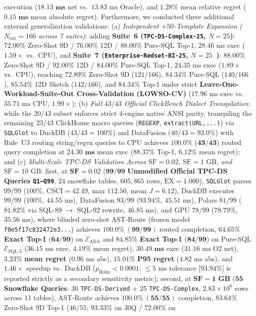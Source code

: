 \documentclass[10pt,a4paper]{article}
\begin{document}
\begin{enumerate}[leftmargin=1.5em,itemsep=0.8pt]
execution ($\mathbf{18.13\text{ ms}}$ net vs.\ $13.83\text{ ms}$ Oracle), and $\mathbf{1.28\%}$ mean relative regret ($\mathbf{0.15\text{ ms}}$ mean absolute regret). Furthermore, we conducted three additional external generalization validations: (a) \emph{Independent $+50$-Template Expansion ($N_{\text{ext}}=166$ across 7 suites)}: adding \textbf{Suite~6 (\texttt{TPC-DS-Complex-25}, $N=25$)}: $72.00\%$ Zero-Shot 9D / $76.00\%$ 12D / $88.00\%$ Pure-SQL Top-1, $28.46\text{ ms}$ exec ($1.59\times$ vs.\ CPU), and \textbf{Suite~7 (\texttt{Enterprise-Redset-BI-25}, $N=25$~\cite{vanrenen2024redset})}: $88.00\%$ Zero-Shot 9D / $92.00\%$ 12D / $84.00\%$ Pure-SQL Top-1, $24.35\text{ ms}$ exec ($1.89\times$ vs.\ CPU), reaching $\mathbf{72.89\%}$ Zero-Shot 9D ($121/166$), $\mathbf{84.34\%}$ Pure-SQL ($140/166$), $\mathbf{85.54\%}$ 12D Sketch ($142/166$), and $\mathbf{84.34\%}$ Top-1 under strict \textbf{Leave-One-Workload-Suite-Out Cross-Validation (LOWSO-CV)} ($17.96\text{ ms}$ exec vs.\ $35.71\text{ ms}$ CPU, $1.99\times$); (b) \emph{Full $43/43$ Official ClickBench Dialect Transpilation}: while the $20/43$ subset enforces strict 4-engine native ANSI parity, transpiling the remaining $23/43$ ClickHouse macro queries (\texttt{REGEXP}, \texttt{extract(URL,...)}) via \texttt{SQLGlot} to DuckDB ($43/43 = 100\%$) and DataFusion ($40/43 = 93.0\%$) with Rule~U3 routing string/regex queries to CPU achieves $\mathbf{100.0\%}$ ($\mathbf{43/43}$) routed query completion at $\mathbf{24.30\text{ ms}}$ mean exec ($\mathbf{88.37\%}$ Top-1, $\mathbf{6.12\%}$ mean regret); and (c) \emph{Multi-Scale TPC-DS Validation Across $\text{SF}=0.02$, $\text{SF}=1\text{ GB}$, and $\text{SF}=10\text{ GB}$}: first, at $\mathbf{\text{SF}=0.02}$ ($\mathbf{99/99}$ \textbf{Unmodified Official TPC-DS Queries \texttt{Q1--Q99}}, $24$ snowflake tables, $605{,}865$ rows, $\text{EX}=1.000$), \texttt{SQLGlot} parses $99/99$ ($100\%$, $\overline{\text{CSCI}}=42.49$, max $112.50$, mean $J=6.12$), DuckDB executes $99/99$ ($100\%$, $44.55\text{ ms}$), DataFusion $93/99$ ($93.94\%$, $45.51\text{ ms}$), Polars $81/99$ ($81.82\%$ via SQL-89 $\rightarrow$ SQL-92 rewrite, $46.85\text{ ms}$), and GPU $78/99$ ($78.79\%$, $35.56\text{ ms}$), where blinded zero-shot AST-Route (frozen model \texttt{f0e5f17c832472e3...}) achieves $\mathbf{100.0\%\ (99/99)}$ routed completion, $\mathbf{64.65\%}$ \textbf{Exact Top-1} ($\mathbf{64/99}$) on $\mathcal{E}_{\text{All-6}}$ and $\mathbf{84.85\%}$ \textbf{Exact Top-1} ($\mathbf{84/99}$) on Pure-SQL $\mathcal{E}_{\text{SQL-5}}$ ($36.15\text{ ms}$ exec, $4.19\%$ mean regret), $\mathbf{30.49\text{ ms}}$ exec ($31.16\text{ ms}$ O2 net), $\mathbf{3.23\%}$ \textbf{mean regret} ($0.96\text{ ms}$ abs), $\mathbf{15.01\%}$ \textbf{P95 regret} ($4.82\text{ ms}$ abs), and $\mathbf{1.46\times}$ speedup vs.\ DuckDB ($p_{\text{Holm}}<0.0001$; $\le 5\text{ ms}$ tolerance [$93.94\%$] is reported strictly as a secondary sensitivity metric); second, at $\mathbf{\text{SF}=1\text{ GB}}$ ($\mathbf{55}$ \textbf{Snowflake Queries}: $30$ \texttt{TPC-DS-Derived} + $25$ \texttt{TPC-DS-Complex}, $2.83\times 10^6$ rows across 11 tables), AST-Route achieves $\mathbf{100.0\%\ (55/55)}$ completion, $\mathbf{83.64\%}$ Zero-Shot 9D Top-1 ($46/55$; $93.33\%$ on 30Q / $72.00\%$ on 
\end{enumerate}
\end{document}
